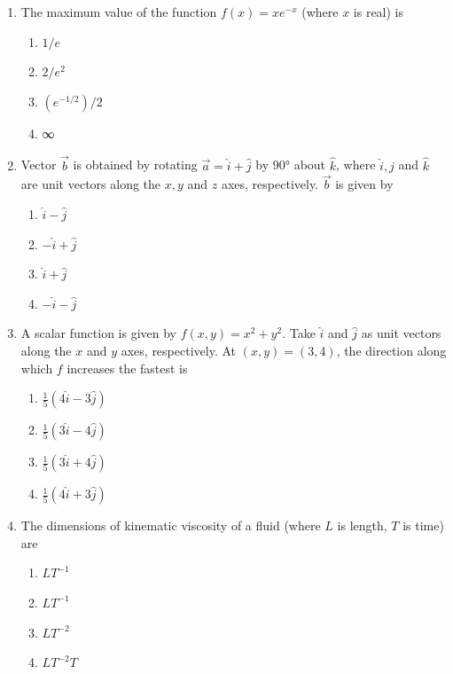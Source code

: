 \documentclass{article}
\begin{document}
\begin{enumerate}[leftmargin=*, resume]
\item The maximum value of the function \( f(x) = xe^{-x} \) (where \( x \) is real) is
\begin{multicols}{4}
\begin{enumerate}
\item \( 1/e \)
\item \( 2/e^2 \)
\item \( (e^{-1/2})/2 \)
\item ∞
\end{enumerate}
\end{multicols}

\item Vector \( \vec{b} \) is obtained by rotating \( \vec{a} = \hat{i} + \hat{j} \) by 90° about \( \hat{k} \), where \( \hat{i}, \hat{j} \) and \( \hat{k} \) are unit vectors along the \( x, y \) and \( z \) axes, respectively. \( \vec{b} \) is given by
\begin{multicols}{4}
\begin{enumerate}
\item \( \hat{i} - \hat{j} \)
\item \( -\hat{i} + \hat{j} \)
\item \( \hat{i} + \hat{j} \)
\item \( -\hat{i} - \hat{j} \)
\end{enumerate}
\end{multicols}

\item A scalar function is given by \( f(x, y) = x^2 + y^2 \). Take \( \hat{i} \) and \( \hat{j} \) as unit vectors along the \( x \) and \( y \) axes, respectively. At \( (x, y) = (3, 4) \), the direction along which \( f \) increases the fastest is
\begin{multicols}{4}
\begin{enumerate}
\item \( \frac{1}{5}(4\hat{i} - 3\hat{j}) \)
\item \( \frac{1}{5}(3\hat{i} - 4\hat{j}) \)
\item \( \frac{1}{5}(3\hat{i} + 4\hat{j}) \)
\item \( \frac{1}{5}(4\hat{i} + 3\hat{j}) \)
\end{enumerate}
\end{multicols}

\item The dimensions of kinematic viscosity of a fluid (where \( L \) is length, \( T \) is time) are
\begin{multicols}{4}
\begin{enumerate}
\item \( LT^{-1} \)
\item \( LT^{-1} \)
\item \( LT^{-2} \)
\item \( LT^{-2}T \)
\end{enumerate}
\end{multicols}


\end{enumerate}
\end{document}
